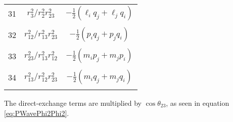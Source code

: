 \documentclass[Dissertation.tex]{subfiles}
\begin{document}
\begin{center}
\begin{longtable}{|c|c|c|}
31  & $r_3^2/r_2^2 r_{23}^2$  & $-\frac{1}{2} (\ell_i q_j + \ell_j q_i)$ \\
&  &  \\
32  & $r_{12}^2/r_{13}^2 r_{23}^2$  & $-\frac{1}{2} (p_i q_j + p_j q_i) $ \\
&  &  \\
33  & $r_{23}^2/r_{13}^2 r_{12}^2$  & $-\frac{1}{2} (m_i p_j + m_j p_i)$ \\
&  &  \\
34  & $r_{13}^2/r_{12}^2 r_{23}^2$  & $-\frac{1}{2} (m_i q_j + m_j q_i)$ \\
&  &  \\
\end{longtable}
\end{center}

The direct-exchange terms are multiplied by $\cos \theta_{23}$, as seen in equation \ref{eq:PWavePhi2Phi2}.
\end{document}
